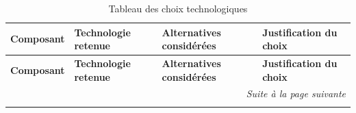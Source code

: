 \begin{longtable}{|p{2.8cm}|p{2.5cm}|p{2.5cm}|p{5.2cm}|}
\caption{Tableau des choix technologiques}
\label{tab:tech-choices} \\

\hline
\textbf{Composant} & \textbf{Technologie retenue} & \textbf{Alternatives considérées} & \textbf{Justification du choix} \\
\hline
\endfirsthead

\hline
\textbf{Composant} & \textbf{Technologie retenue} & \textbf{Alternatives considérées} & \textbf{Justification du choix} \\
\hline
\endhead

\hline
\multicolumn{4}{r|}{\small\textit{Suite à la page suivante}} \\
\endfoot

\hline
\endlastfoot


\end{longtable}
